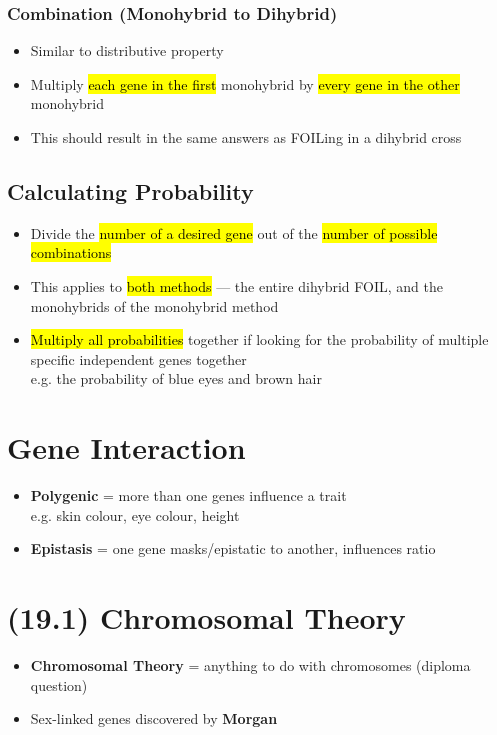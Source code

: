 \documentclass[a4paper,12pt]{article}
\begin{document}
\subsubsection{Combination (Monohybrid to Dihybrid)}
\begin{itemize}
    \item{Similar to distributive property}
    \item{Multiply \hl{each gene in the first} monohybrid by \hl{every gene in the other} monohybrid}
    \item{This should result in the same answers as FOILing in a dihybrid cross}
\end{itemize}

\subsection{Calculating Probability}
\begin{itemize}
    \item{Divide the \hl{number of a desired gene} out of the \hl{number of possible combinations}}
    \item{This applies to \hl{both methods} --- the entire dihybrid FOIL, and the monohybrids of the monohybrid method}
    \item{\hl{Multiply all probabilities} together if looking for the probability of multiple specific independent genes together \\ e.g. the probability of blue eyes and brown hair}
\end{itemize}

\section{Gene Interaction}
\begin{itemize}
    \item{\textbf{Polygenic} = more than one genes influence a trait \\ e.g. skin colour, eye colour, height}
    \item{\textbf{Epistasis} = one gene masks/epistatic to another, influences ratio}
\end{itemize}

\section{(19.1) Chromosomal Theory}
\begin{itemize}
    \item{\textbf{Chromosomal Theory} = anything to do with chromosomes (diploma question)}
    \item{Sex-linked genes discovered by \textbf{Morgan}}
\end{itemize}
\end{document}
